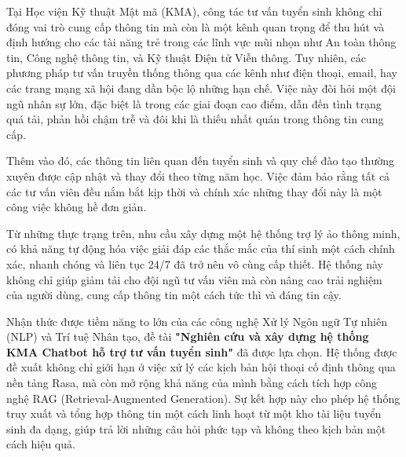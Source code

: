 \documentclass[12pt,a4paper]{report}
\begin{document}
Tại Học viện Kỹ thuật Mật mã (KMA), công tác tư vấn tuyển sinh không chỉ đóng vai trò cung cấp thông tin mà còn là một kênh quan trọng để thu hút và định hướng cho các tài năng trẻ trong các lĩnh vực mũi nhọn như An toàn thông tin, Công nghệ thông tin, và Kỹ thuật Điện tử Viễn thông. Tuy nhiên, các phương pháp tư vấn truyền thống thông qua các kênh như điện thoại, email, hay các trang mạng xã hội đang dần bộc lộ những hạn chế. Việc này đòi hỏi một đội ngũ nhân sự lớn, đặc biệt là trong các giai đoạn cao điểm, dẫn đến tình trạng quá tải, phản hồi chậm trễ và đôi khi là thiếu nhất quán trong thông tin cung cấp.

Thêm vào đó, các thông tin liên quan đến tuyển sinh và quy chế đào tạo thường xuyên được cập nhật và thay đổi theo từng năm học. Việc đảm bảo rằng tất cả các tư vấn viên đều nắm bắt kịp thời và chính xác những thay đổi này là một công việc không hề đơn giản.

Từ những thực trạng trên, nhu cầu xây dựng một hệ thống trợ lý ảo thông minh, có khả năng tự động hóa việc giải đáp các thắc mắc của thí sinh một cách chính xác, nhanh chóng và liên tục 24/7 đã trở nên vô cùng cấp thiết. Hệ thống này không chỉ giúp giảm tải cho đội ngũ tư vấn viên mà còn nâng cao trải nghiệm của người dùng, cung cấp thông tin một cách tức thì và đáng tin cậy.

Nhận thức được tiềm năng to lớn của các công nghệ Xử lý Ngôn ngữ Tự nhiên (NLP) và Trí tuệ Nhân tạo, đề tài \textbf{"Nghiên cứu và xây dựng hệ thống KMA Chatbot hỗ trợ tư vấn tuyển sinh"} đã được lựa chọn. Hệ thống được đề xuất không chỉ giới hạn ở việc xử lý các kịch bản hội thoại cố định thông qua nền tảng Rasa, mà còn mở rộng khả năng của mình bằng cách tích hợp công nghệ RAG (Retrieval-Augmented Generation). Sự kết hợp này cho phép hệ thống truy xuất và tổng hợp thông tin một cách linh hoạt từ một kho tài liệu tuyển sinh đa dạng, giúp trả lời những câu hỏi phức tạp và không theo kịch bản một cách hiệu quả.
\end{document}
